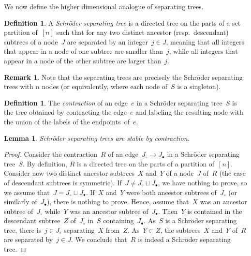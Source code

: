 \documentclass{amsart}
\newtheorem{lemma}[theorem]{Lemma}
\theoremstyle{definition}
\newtheorem{definition}[theorem]{Definition}
\newtheorem{remark}[theorem]{Remark}
\newcommand{\darkblue}{\color{darkblue}} %
\newcommand{\defn}[1]{\textsl{\darkblue #1}} %
\begin{document}
We now define the higher dimensional analogue of separating trees.

\begin{definition}
\label{def:ShcroderSeparatingTree}
A \defn{Schröder separating tree} is a directed tree on the parts of a set partition of~$[n]$ such that for any two distinct ancestor (resp.~descendant) subtrees of a node~$J$ are separated by an integer~$j \in J$, meaning that all integers that appear in a node of one subtree are smaller than~$j$, while all integers that appear in a node of the other subtree are larger than~$j$.
\end{definition}

\begin{remark}
Note that the separating trees are precisely the Schröder separating trees with $n$ nodes (or equivalently, where each node of~$S$ is a singleton).
\end{remark}

\begin{definition}
The \defn{contraction} of an edge~$e$ in a Schröder separating tree~$S$ is the tree obtained by contracting the edge~$e$ and labeling the resulting node with the union of the labels of the endpoints~of~$e$.
\end{definition}

\begin{lemma}
\label{lem:contractionSchroderSeparatingTree}
Schröder separating trees are stable by contraction.
\end{lemma}

\begin{proof}
Consider the contraction~$R$ of an edge~$J_\circ \to J_\bullet$ in a Schröder separating tree~$S$.
By definition, $R$ is a directed tree on the parts of a partition of~$[n]$.
Consider now two distinct ancestor subtrees~$X$ and~$Y$ of a node~$J$ of~$R$ (the case of descendant subtrees is symmetric).
If~$J \ne J_\circ \sqcup J_\bullet$, we have nothing to prove, so we assume that~$J = J_\circ \sqcup J_\bullet$.
If~$X$ and~$Y$ were both ancestor subtrees of~$J_\circ$ (or similarly of~$J_\bullet$), there is nothing to prove.
Hence, assume that~$X$ was an ancestor subtree of~$J_\circ$ while~$Y$ was an ancestor subtree of~$J_\bullet$.
Then~$Y$ is contained in the descendant subtree~$Z$ of~$J_\circ$ in~$S$ containing~$J_\bullet$.
As~$S$ is a Schröder separating tree, there is~$j \in J_\circ$ separating~$X$ from~$Z$.
As~$Y \subset Z$, the subtrees~$X$ and~$Y$ of~$R$ are separated by~$j \in J$.
We conclude that~$R$ is indeed a Schröder separating tree.
\end{proof}
\end{document}
